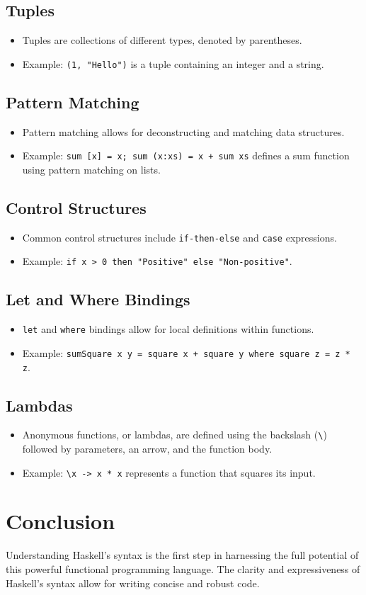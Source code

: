 \subsection{Tuples}
\begin{itemize}
	\item Tuples are collections of different types, denoted by parentheses.
	\item Example: \texttt{(1, "Hello")} is a tuple containing an integer and a string.
\end{itemize}

\subsection{Pattern Matching}
\begin{itemize}
	\item Pattern matching allows for deconstructing and matching data structures.
	\item Example: \texttt{sum [x] = x; sum (x:xs) = x + sum xs} defines a sum function using pattern matching on lists.
\end{itemize}

\subsection{Control Structures}
\begin{itemize}
	\item Common control structures include \texttt{if-then-else} and \texttt{case} expressions.
	\item Example: \texttt{if x > 0 then "Positive" else "Non-positive"}.
\end{itemize}

\subsection{Let and Where Bindings}
\begin{itemize}
	\item \texttt{let} and \texttt{where} bindings allow for local definitions within functions.
	\item Example: \texttt{sumSquare x y = square x + square y where square z = z * z}.
\end{itemize}

\subsection{Lambdas}
\begin{itemize}
	\item Anonymous functions, or lambdas, are defined using the backslash (\texttt{\textbackslash}) followed by parameters, an arrow, and the function body.
	\item Example: \texttt{\textbackslash x -> x * x} represents a function that squares its input.
\end{itemize}

\section{Conclusion}
Understanding Haskell's syntax is the first step in harnessing the full potential of this powerful functional programming language. The clarity and expressiveness of Haskell's syntax allow for writing concise and robust code.



